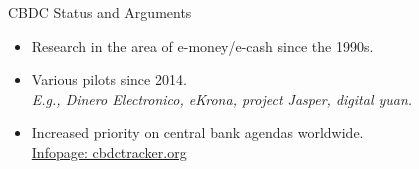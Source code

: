 \documentclass[handout]{beamer}
\begin{document}
\begin{frame}{CBDC Status and Arguments}

\begin{itemize}
	\item Research in the area of e-money/e-cash since the 1990s.
	\item Various pilots since 2014.\\
			\textit{E.g., Dinero Electronico, eKrona, project Jasper, digital yuan.}
	\item Increased priority on central bank agendas worldwide.\\
	\link \href{https://www.cbdctracker.org}{Infopage: cbdctracker.org}
\end{itemize}

\vspace{1.0em}

\end{frame}
\end{document}
